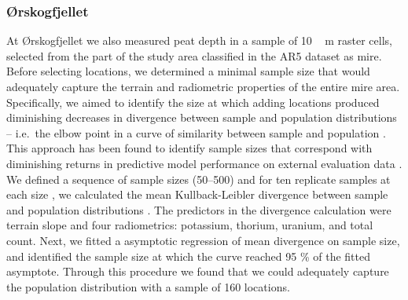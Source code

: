 \documentclass[soil, manuscript]{copernicus}
\begin{document}
\subsubsection{Ørskogfjellet}

At Ørskogfjellet we also measured peat depth in a sample of \unit{10\,m} raster cells, selected from the part of the study area classified in the AR5 dataset as mire.
Before selecting locations, we determined a minimal sample size that would adequately capture the terrain and radiometric properties of the entire mire area.
Specifically, we aimed to identify the size at which adding locations produced diminishing decreases in divergence between sample and population distributions -- i.e.~the elbow point in a curve of similarity between sample and population \citep{maloneMethodsImproveUtility2019}.
This approach has been found to identify sample sizes that correspond with diminishing returns in predictive model performance on external evaluation data \citep{sauretteDivergenceMetricsDetermining2023}.
We defined a sequence of sample sizes (50--500) and for ten replicate samples at each size \citep[drawn by conditioned latin hypercube sampling,][]{minasnyConditionedLatinHypercube2006, roudierClhsPackageConditioned2011}, we calculated the mean Kullback-Leibler divergence between sample and population distributions \citep{maloneMethodsImproveUtility2019, sauretteDivergenceMetricsDetermining2023}.
The predictors in the divergence calculation were terrain slope and four radiometrics: potassium, thorium, uranium, and total count.
Next, we fitted a asymptotic regression of mean divergence on sample size, and identified the sample size at which the curve reached 95 \% of the fitted asymptote.
Through this procedure we found that we could adequately capture the population distribution with a sample of 160 locations.
\end{document}
